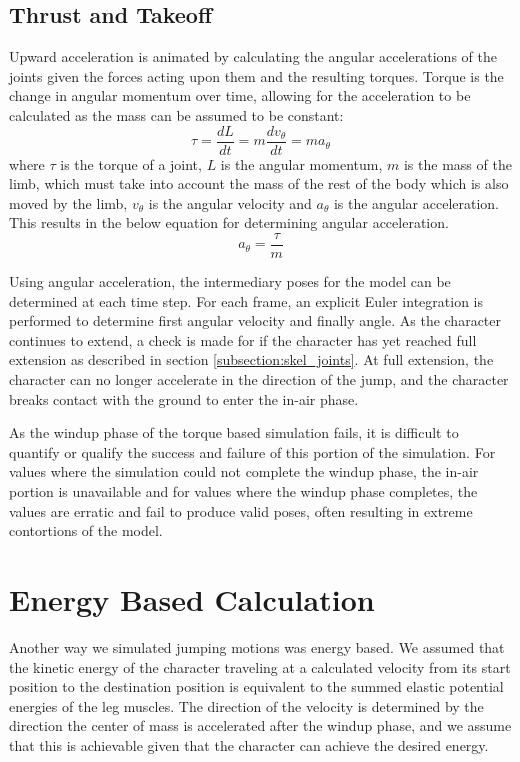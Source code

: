 \subsection{Thrust and Takeoff}
\label{subsection:thrust}
Upward acceleration is animated by calculating the angular accelerations of the joints given the forces acting upon them and the resulting torques.  Torque is the change in angular momentum over time, allowing for the acceleration to be calculated as the mass can be assumed to be constant: \[\tau = \dfrac{dL}{dt} = m \dfrac{dv_{\theta}}{dt} = m a_{\theta}\] where $\tau$ is the torque of a joint, $L$ is the angular momentum, $m$ is the mass of the limb, which must take into account the mass of the rest of the body which is also moved by the limb, $v_{\theta}$ is the angular velocity and $a_{\theta}$ is the angular acceleration. This results in the below equation for determining angular acceleration. \[a_{\theta} = \dfrac{\tau}{m}\]

Using angular acceleration, the intermediary poses for the model can be determined at each time step.   For each frame, an explicit Euler integration is performed to determine first angular velocity and finally angle.  As the character continues to extend, a check is made for if the character has yet reached full extension as described in section \ref{subsection:skel_joints}.  At full extension, the character can no longer accelerate in the direction of the jump, and the character breaks contact with the ground to enter the in-air phase.

As the windup phase of the torque based simulation fails, it is difficult to quantify or qualify the success and failure of this portion of the simulation.  For values where the simulation could not complete the windup phase, the in-air portion is unavailable and for values where the windup phase completes, the values are erratic and fail to produce valid poses, often resulting in extreme contortions of the model.


\section{Energy Based Calculation}
\label{section:energy}
Another way we simulated jumping motions was energy based.  We assumed that the kinetic energy of the character traveling at a calculated velocity from its start position to the destination position is equivalent to the summed elastic potential energies of the leg muscles.  The direction of the velocity is determined by the direction the center of mass is accelerated after the windup phase, and we assume that this is achievable given that the character can achieve the desired energy.  

